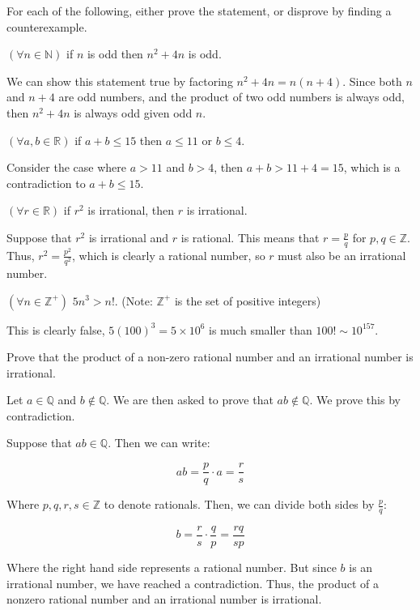 \documentclass[11pt]{article}
\begin{document}
For each of the following, either prove the statement, or disprove by finding a counterexample.
\begin{Parts}
	\Part $(\forall n \in \mathbb{N})$ if $n$ is odd then $n^2 + 4n$ is odd.

    \begin{solution}
        We can show this statement true by factoring $n^2 + 4n = n(n+4)$. Since both $n$ and $n + 4$ are odd numbers, and the product of two odd numbers is always odd, then $n^2 + 4n$ is always odd given odd $n$.
    \end{solution}

	\Part $(\forall a, b \in \mathbb{R})$ if $a + b \le 15$ then $a \le 11$ or $b \le 4$.

    \begin{solution}
        Consider the case where $a > 11$ and $b > 4$, then $a + b > 11 + 4 = 15$, which is a contradiction to $a + b \le 15$.
    \end{solution}
	\Part $(\forall r \in \mathbb{R})$ if $r^2$ is irrational, then $r$ is irrational.
\begin{solution}
    Suppose that $r^2$ is irrational and $r$ is rational. This means that $r =\frac{p}{q}$ for $p, q \in \mathbb Z$. Thus, $r^2 = \frac{p^2}{q^2}$, which is clearly a rational number, so $r$ must also be an irrational number.
\end{solution} 
	\Part $(\forall n \in \mathbb{Z}^+)$ $5n^3 > n!$. (Note: $\mathbb{Z}^+$ is the set of positive integers)
    \begin{solution}
    This is clearly false, $5(100)^3 = 5 \times 10^6$ is much smaller than $100! \sim 10^{157}$.
    \end{solution}
\end{Parts}

Prove that the product of a non-zero rational number and an irrational number is irrational.

\begin{solution}
    Let $a \in \mathbb Q$ and $b \notin \mathbb Q$. We are then asked to prove that $ab \notin \mathbb Q$. We prove this by contradiction.

    Suppose that $ab \in \mathbb Q$. Then we can write:

    \[ ab = \frac{p}{q} \cdot a = \frac{r}{s}\]

    Where $p, q, r, s \in \mathbb Z$ to denote rationals. Then, we can divide both sides by $\frac{p}{q}$:

    \[ b = \frac{r}{s} \cdot \frac{q}{p} = \frac{rq}{sp}\] 

    Where the right hand side represents a rational number. But since $b$ is an irrational number, we have reached a contradiction. Thus, the product of a nonzero rational number and an irrational number is irrational.
\end{solution}
\end{document}
